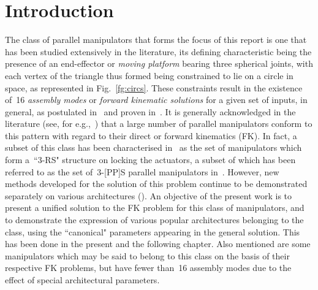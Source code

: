 \documentclass[DD]{iitmdiss}
\newcommand{\mref}[1]{\ref{#1}}
\newcommand{\mcite}[1]{\cite{#1}}
\newcommand{\mlabel}[1]{\label{#1}}
\begin{document}
\section{Introduction}\mlabel{sc:classintro} 
% 
The class of parallel manipulators that forms the focus of this report is one that has been studied extensively in the literature, its defining characteristic being the presence of an end-effector or \emph{moving platform} bearing three spherical joints, with each vertex of the triangle thus formed being constrained to lie on a circle in space, as represented in Fig.~\mref{fg:circs}. These constraints result in the existence of~16 \emph{assembly modes} or \emph{forward kinematic solutions} for a given set of inputs, in general, as postulated in~\mcite{hunt1993,hunt1978} and proven in~\mcite{merlet1992}. It is generally acknowledged in the literature (see, for e.g.,~\mcite{merletbook}) that a large number of parallel manipulators conform to this pattern with regard to their direct or forward kinematics (FK). In fact, a subset of this class has been characterised in~\mcite{kong2018} as the set of manipulators which form a~``3-RS" structure on locking the actuators, a subset of which has been referred to as the set of~3-[PP]S parallel manipulators in~\mcite{bonev2008,nayak2018b}. However, new methods developed for the solution of this problem continue to be demonstrated separately on various architectures (\mcite{kong2018,silla2017}).
An objective of the present work is to present a unified solution to the FK problem for this class of manipulators, and to demonstrate the expression of various popular architectures belonging to the class, using the ``canonical" parameters appearing in the general solution. This has been done in the present and the following chapter. Also mentioned are some manipulators which may be said to belong to this class on the basis of their respective FK problems, but have fewer than~16 assembly modes due to the effect of special architectural parameters.\\
\end{document}
